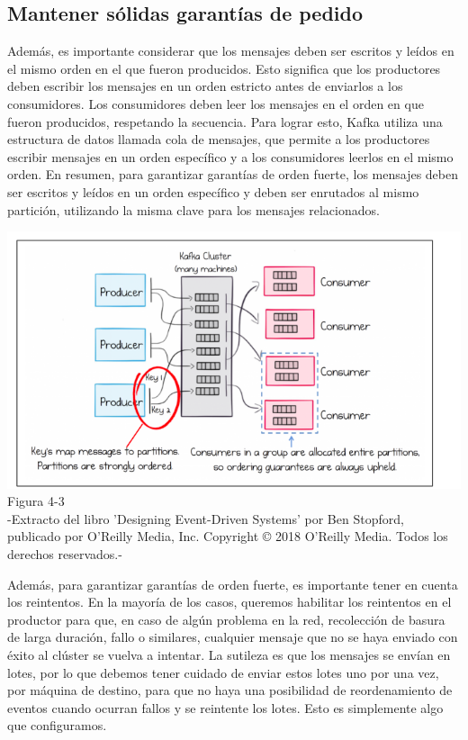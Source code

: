 \documentclass{article}
\begin{document}
\subsection{Mantener sólidas garantías de pedido}
Además, es importante considerar que los mensajes deben ser escritos y leídos en el mismo orden en el que fueron producidos. Esto significa que los productores deben escribir los mensajes en un orden estricto antes de enviarlos a los consumidores. Los consumidores deben leer los mensajes en el orden en que fueron producidos, respetando la secuencia. Para lograr esto, Kafka utiliza una estructura de datos llamada cola de mensajes, que permite a los productores escribir mensajes en un orden específico y a los consumidores leerlos en el mismo orden. En resumen, para garantizar garantías de orden fuerte, los mensajes deben ser escritos y leídos en un orden específico y deben ser enrutados al mismo partición, utilizando la misma clave para los mensajes relacionados.
\begin{center}
    \includegraphics[scale=0.8]{figure4.3.png}
    Figura 4-3\\
    -Extracto del libro 'Designing Event-Driven Systems' por Ben Stopford, publicado por O'Reilly Media, Inc. Copyright © 2018 O'Reilly Media. Todos los derechos reservados.-
\end{center}
Además, para garantizar garantías de orden fuerte, es importante tener en cuenta los reintentos. En la mayoría de los casos, queremos habilitar los reintentos en el productor para que, en caso de algún problema en la red, recolección de basura de larga duración, fallo o similares, cualquier mensaje que no se haya enviado con éxito al clúster se vuelva a intentar. La sutileza es que los mensajes se envían en lotes, por lo que debemos tener cuidado de enviar estos lotes uno por una vez, por máquina de destino, para que no haya una posibilidad de reordenamiento de eventos cuando ocurran fallos y se reintente los lotes. Esto es simplemente algo que configuramos.
\end{document}
